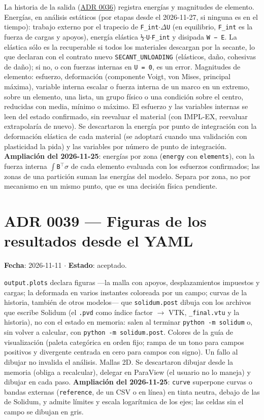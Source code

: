 \documentclass[11pt,oneside]{report}
\begin{document}
La historia de la salida (\hyperref[adr:0036]{ADR 0036}) registra energías y magnitudes de elemento. Energías, en análisis estáticos (por etapas desde el 2026-11-27, si ninguna es en el tiempo): trabajo externo por el trapecio de \texttt{F\_int\ensuremath{\cdot}\ensuremath{\Delta}U} (en equilibrio, \texttt{F\_int} es la fuerza de cargas y apoyos), energía elástica \texttt{½\ensuremath{\cdot}U\ensuremath{\cdot}F\_int} y disipada \texttt{W − E}. La elástica sólo es la recuperable si todos los materiales descargan por la secante, lo que declaran con el contrato nuevo \texttt{SECANT\_UNLOADING} (elásticos, daño, cohesivas de daño); si no, o con fuerzas internas en \texttt{U = 0}, es un error. Magnitudes de elemento: esfuerzo, deformación (componente Voigt, von Mises, principal máxima), variable interna escalar o fuerza interna de un marco en un extremo, sobre un elemento, una lista, un grupo físico o una condición sobre el centro, reducidas con media, mínimo o máximo. El esfuerzo y las variables internas se leen del estado confirmado, sin reevaluar el material (con IMPL-EX, reevaluar extrapolaría de nuevo). Se descartaron la energía por punto de integración con la deformación elástica de cada material (se adoptará cuando una validación con plasticidad la pida) y las variables por número de punto de integración. \textbf{Ampliación del 2026-11-25}: energías por zona (\texttt{energy} con \texttt{elements}), con la fuerza interna \texttt{\ensuremath{\int}B\ensuremath{^{\top}}\ensuremath{\sigma}} de cada elemento evaluada con los esfuerzos confirmados; las zonas de una partición suman las energías del modelo. Separa por zona, no por mecanismo en un mismo punto, que es una decisión física pendiente.

\section{ADR 0039 --- Figuras de los resultados desde el YAML}
\label{adr:0039}

\textbf{Fecha}: 2026-11-11 \ensuremath{\cdot} \textbf{Estado}: aceptado.

\texttt{output.plots} declara figuras ---la malla con apoyos, desplazamientos impuestos y cargas; la deformada en varios instantes coloreada por un campo; curvas de la historia, también de otros modelos--- que \texttt{solidum.post} dibuja con los archivos que escribe Solidum (el \texttt{.pvd} como índice factor \ensuremath{\to} VTK, \texttt{\_final.vtu} y la historia), no con el estado en memoria: salen al terminar \texttt{python -m solidum} o, sin volver a calcular, con \texttt{python -m solidum.\allowbreak{}post}. Colores de la guía de visualización (paleta categórica en orden fijo; rampa de un tono para campos positivos y divergente centrada en cero para campos con signo). Un fallo al dibujar no invalida el análisis. Mallas 2D. Se descartaron dibujar desde la memoria (obliga a recalcular), delegar en ParaView (el usuario no lo maneja) y dibujar en cada paso. \textbf{Ampliación del 2026-11-25}: \texttt{curve} superpone curvas o bandas externas (\texttt{reference}, de un CSV o en línea) en tinta neutra, debajo de las de Solidum, y admite límites y escala logarítmica de los ejes; las celdas sin el campo se dibujan en gris.
\end{document}
